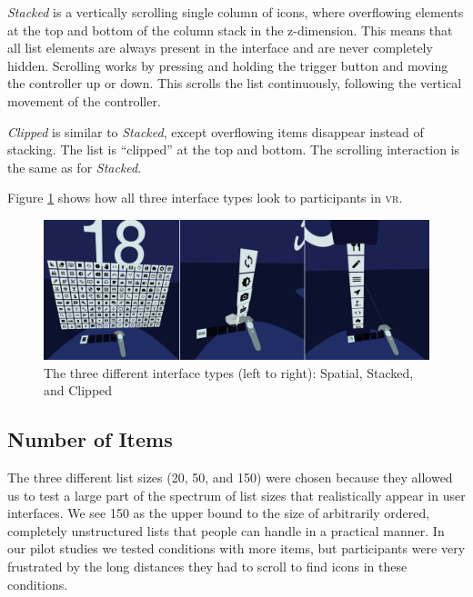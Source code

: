\documentclass{tufte-book} %
\begin{document}
\emph{Stacked} is a vertically scrolling single column of icons, where overflowing elements at the top and bottom of the column stack in the z-dimension. This means that all list elements are always present in the interface and are never completely hidden. Scrolling works by pressing and holding the trigger button and moving the controller up or down. This scrolls the list continuously, following the vertical movement of the controller.

\emph{Clipped} is similar to \emph{Stacked}, except overflowing items disappear instead of stacking. The list is ``clipped'' at the top and bottom. The scrolling interaction is the same as for \emph{Stacked}.

Figure \ref{fig:interface-types} shows how all three interface types look to participants in \textsc{vr}.

\begin{figure}[h]
\includegraphics[width=\linewidth]{interface-types.png}
\caption{The three different interface types (left to right): Spatial, Stacked, and Clipped}
\label{fig:interface-types}
\end{figure}

\subsection{Number of Items}
The three different list sizes (20, 50, and 150) were chosen because they allowed us to test a large part of the spectrum of list sizes that realistically appear in user interfaces. We see 150 as the upper bound to the size of arbitrarily ordered, completely unstructured lists that people can handle in a practical manner. In our pilot studies we tested conditions with more items, but participants were very frustrated by the long distances they had to scroll to find icons in these conditions.
\end{document}
